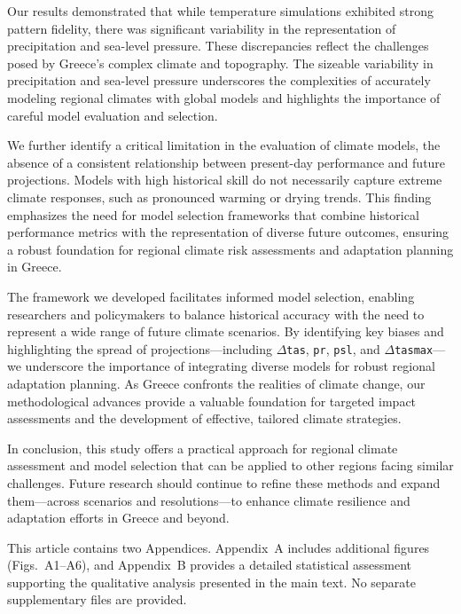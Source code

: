 \documentclass[pdflatex,sn-chicago]{sn-jnl}%
\theoremstyle{thmstyleone}%
\theoremstyle{thmstyletwo}%
\theoremstyle{thmstylethree}%
\begin{document}
Our results demonstrated that while temperature simulations exhibited strong pattern fidelity, there was significant variability in the representation of precipitation and sea-level pressure. These discrepancies reflect the challenges posed by Greece's complex climate and topography. The sizeable variability in precipitation and sea-level pressure underscores the complexities of accurately modeling regional climates with global models and highlights the importance of careful model evaluation and selection.

We further identify a critical limitation in the evaluation of climate models, the absence of a consistent relationship between present-day performance and future projections. Models with high historical skill do not necessarily capture extreme climate responses, such as pronounced warming or drying trends. This finding emphasizes the need for model selection frameworks that combine historical performance metrics with the representation of diverse future outcomes, ensuring a robust foundation for regional climate risk assessments and adaptation planning in Greece.

The framework we developed facilitates informed model selection, enabling researchers and policymakers to balance historical accuracy with the need to represent a wide range of future climate scenarios. By identifying key biases and highlighting the spread of projections---including \(\Delta\)\texttt{tas}, \texttt{pr}, \texttt{psl}, and \(\Delta\)\texttt{tasmax}---we underscore the importance of integrating diverse models for robust regional adaptation planning. As Greece confronts the realities of climate change, our methodological advances provide a valuable foundation for targeted impact assessments and the development of effective, tailored climate strategies.

In conclusion, this study offers a practical approach for regional climate assessment and model selection that can be applied to other regions facing similar challenges. Future research should continue to refine these methods and expand them---across scenarios and resolutions---to enhance climate resilience and adaptation efforts in Greece and beyond.

\backmatter

This article contains two Appendices. Appendix~A includes additional figures (Figs.~A1--A6), 
and Appendix~B provides a detailed statistical assessment supporting the qualitative analysis presented in the main text.
No separate supplementary files are provided.
\end{document}
